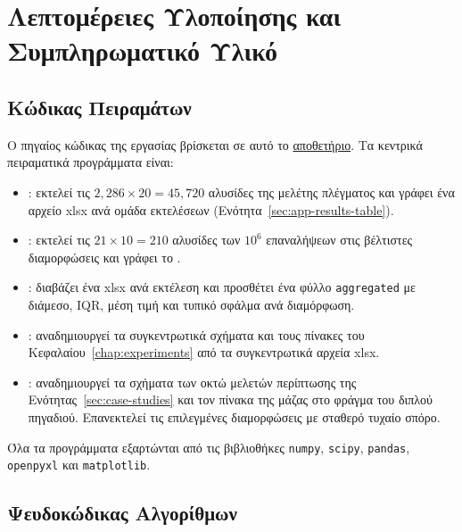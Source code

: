\appendix
\setlength{\emergencystretch}{3em}

\chapter{Λεπτομέρειες Υλοποίησης και Συμπληρωματικό Υλικό}
\label{chap:appendix}

\section{Κώδικας Πειραμάτων}
\label{sec:app-reproducibility}

Ο πηγαίος κώδικας της εργασίας βρίσκεται σε αυτό το \href{https://github.com/AlkisPlas/langevin-sampling}{αποθετήριο}. Τα κεντρικά πειραματικά προγράμματα είναι:

\begin{itemize}
  \item {}: εκτελεί τις $2{,}286 \times 20 = 45{,}720$
        αλυσίδες της μελέτης πλέγματος και γράφει ένα αρχείο xlsx ανά ομάδα εκτελέσεων
        (Ενότητα~\ref{sec:app-results-table}).
  \item {}: εκτελεί τις $21 \times 10 = 210$
        αλυσίδες των $10^6$ επαναλήψεων στις βέλτιστες διαμορφώσεις και γράφει το
        .
  \item {}: διαβάζει ένα xlsx ανά εκτέλεση
        και προσθέτει ένα φύλλο \texttt{aggregated} με διάμεσο, IQR, μέση τιμή
        και τυπικό σφάλμα ανά διαμόρφωση.
  \item {}: αναδημιουργεί
        τα συγκεντρωτικά σχήματα και τους πίνακες του Κεφαλαίου~\ref{chap:experiments} από τα
        συγκεντρωτικά αρχεία xlsx.
  \item {}: αναδημιουργεί
        τα σχήματα των οκτώ μελετών περίπτωσης της
        Ενότητας~\ref{sec:case-studies} και τον πίνακα της μάζας στο φράγμα του διπλού
        πηγαδιού. Επανεκτελεί τις επιλεγμένες διαμορφώσεις με σταθερό τυχαίο σπόρο.
\end{itemize}

Όλα τα προγράμματα εξαρτώνται από τις βιβλιοθήκες \texttt{numpy}, \texttt{scipy},
\texttt{pandas}, \texttt{openpyxl} και \texttt{matplotlib}.

\section{Ψευδοκώδικας Αλγορίθμων}
\label{sec:app-pseudo}

